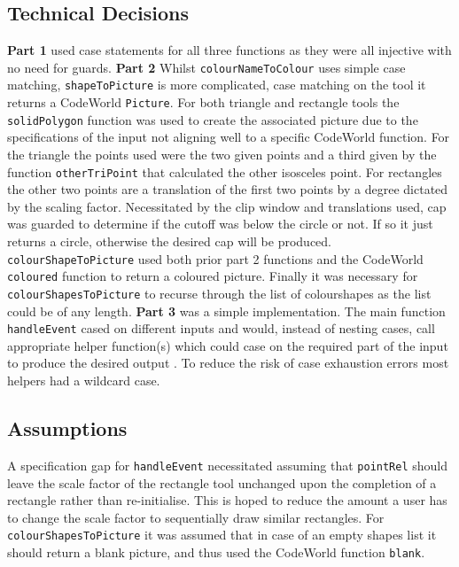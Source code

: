 \documentclass[11pt]{article}
\begin{document}
\subsection{Technical Decisions}
\textbf{Part 1} used case statements for all three functions as they were all injective with no need for guards.
 \textbf{Part 2} Whilst \verb|colourNameToColour| uses simple case matching, \verb|shapeToPicture| is more complicated, case matching on the tool it returns a CodeWorld \verb|Picture|. For both triangle and rectangle tools the \verb|solidPolygon| function was used to create the associated picture due to the specifications of the input not aligning well to a specific CodeWorld function. For the triangle the points used were the two given points and a third given by the function \verb|otherTriPoint| that calculated the other isosceles point. For rectangles the other two points are a translation of the first two points by a degree dictated by the scaling factor. Necessitated by the clip window and translations used, cap was guarded to determine if the cutoff was below the circle or not. If so it just returns a circle, otherwise the desired cap will be produced. \verb|colourShapeToPicture| used both prior part 2 functions and the CodeWorld  \verb|coloured| function to return a coloured picture. Finally it was necessary for  \verb|colourShapesToPicture| to recurse through the list of colourshapes as the list could be of any length.
 \textbf{Part 3} was a simple implementation. The main function \verb|handleEvent| cased on different inputs and would, instead of nesting cases, call appropriate helper function(s) which could case on the required part of the input to produce the desired output .  To reduce the risk of case exhaustion errors most helpers had a wildcard case.

 \subsection{Assumptions}%
A specification gap for \verb|handleEvent| necessitated assuming that \verb|pointRel| should leave the scale factor of the rectangle tool unchanged upon the completion of a rectangle rather than re-initialise. This is hoped to reduce the amount a user has to change the scale factor to sequentially draw similar rectangles. For \verb|colourShapesToPicture| it was assumed that in case of an empty shapes list it should return a blank picture, and thus used the CodeWorld function \verb|blank|.
\end{document}
